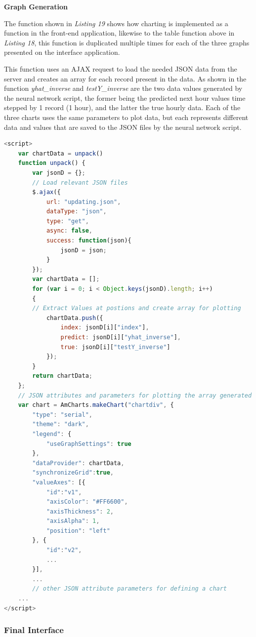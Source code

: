\documentclass[oneside, 12pt]{article}
\begin{document}
		\textbf{Graph Generation}
		
		The function shown in \textit{Listing 19} shows how charting is implemented as a function in the front-end application, likewise to the table function above in \textit{Listing 18}, this function is duplicated multiple times for each of the three graphs presented on the interface application. 
		
		This function uses an AJAX request to load the needed JSON data from the server and creates an array for each record present in the data. As shown in the function \textit{yhat\_inverse} and \textit{testY\_inverse} are the two data values generated by the neural network script, the former being the predicted next hour values time stepped by 1 record (1 hour), and the latter the true hourly data.
		Each of the three charts uses the same parameters to plot data, but each represents different data and values that are saved to the JSON files by the neural network script.
		
		\begin{lstlisting}[language=JavaScript, caption=Chart creation with AJAX request]
<script>
	var chartData = unpack()
	function unpack() {
		var jsonD = {};
		// Load relevant JSON files
		$.ajax({ 
			url: "updating.json", 
			dataType: "json", 
			type: "get", 
			async: false, 
			success: function(json){ 
				jsonD = json;
			} 
		});
		var chartData = [];
		for (var i = 0; i < Object.keys(jsonD).length; i++)
		{
		// Extract Values at postions and create array for plotting
			chartData.push({
				index: jsonD[i]["index"],
				predict: jsonD[i]["yhat_inverse"],
				true: jsonD[i]["testY_inverse"]
			});
		}
		return chartData;
	};
	// JSON attributes and parameters for plotting the array generated
	var chart = AmCharts.makeChart("chartdiv", {
		"type": "serial",
		"theme": "dark",
		"legend": {
			"useGraphSettings": true
		},
		"dataProvider": chartData,
		"synchronizeGrid":true,
		"valueAxes": [{
			"id":"v1",
			"axisColor": "#FF6600",
			"axisThickness": 2,
			"axisAlpha": 1,
			"position": "left"
		}, {
			"id":"v2",
			...
		}],
		...
		// other JSON attribute parameters for defining a chart
	...
</script>
		\end{lstlisting}
		
		\newpage
		\subsubsection{Final Interface}
		
\end{document}

